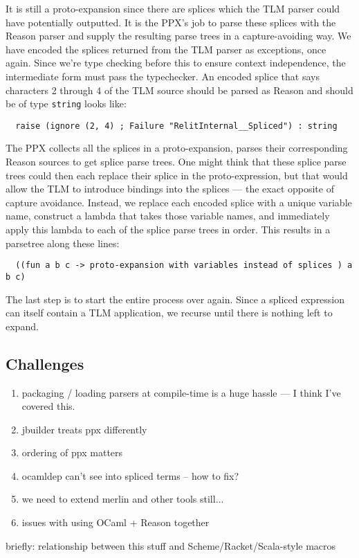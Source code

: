 \documentclass[acmsmall,review]{acmart}
\newcommand{\li}[1]{\lstinline[basicstyle=\ttfamily\fontsize{9pt}{1em}\selectfont]{#1}}
\theoremstyle{slplain}
\numberwithin{thm}{section}
\begin{document}
It is still a proto-expansion since there are splices which the TLM parser could have potentially outputted. It is the PPX's job to parse these splices with the Reason parser and supply the resulting parse trees in a capture-avoiding way.  We have encoded the splices returned from the TLM parser as exceptions, once again. Since we're type checking 
before this to ensure context independence, the intermediate form must pass the typechecker. An encoded splice that says characters 2 through 4 of the TLM source should be parsed as Reason and should be of type \li{string} looks like:

\begin{lstlisting}
  raise (ignore (2, 4) ; Failure "RelitInternal__Spliced") : string
\end{lstlisting}

The PPX collects all the splices in a proto-expansion, parses their corresponding Reason sources to get splice parse trees. One might think that these splice parse trees could then each replace their splice in the proto-expression, but that would allow the TLM to introduce bindings into the splices --- the exact opposite of capture avoidance. Instead, we replace each encoded splice with a unique variable name, construct a lambda that takes those variable names, and immediately apply this lambda to each of the splice parse trees in order. This results in a parsetree along these lines:

\begin{lstlisting}
  ((fun a b c -> proto-expansion with variables instead of splices ) a b c)
\end{lstlisting}

The last step is to start the entire process over again. Since a spliced expression can itself contain a TLM application, we recurse until there is nothing left to expand.




\subsection{Challenges}
\begin{enumerate}
  \item packaging / loading parsers at compile-time is a huge hassle --- I think I've covered this.
  \item jbuilder treats ppx differently
  \item ordering of ppx matters
  \item ocamldep can't see into spliced terms -- how to fix?
  \item we need to extend merlin and other tools still...
  \item issues with using OCaml + Reason together
\end{enumerate}

briefly: relationship between this stuff and Scheme/Racket/Scala-style macros



% 
\end{document}
